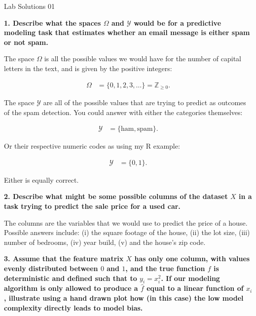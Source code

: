 \documentclass[12pt,hidelinks]{article}
\numberwithin{equation}{section}
\begin{document}
{\LARGE Lab Solutions 01}

\vspace*{12pt}

\textbf{1. Describe what the spaces $\Omega$ and $\mathcal{Y}$ would be for a
predictive modeling task that estimates whether an email message is either
spam or not spam.}

\vspace*{12pt}

The space $\Omega$ is all the possible values we would have for the number
of capital letters in the text, and is given by the positive integers:

\begin{align*}
\Omega &= \{ 0, 1, 2, 3, \ldots \} = \mathbb{Z}_{\geq 0}.
\end{align*}

The space $\mathcal{Y}$ are all of the possible values that are trying to
predict as outcomes of the spam detection. You could answer with either the
categories themselves:

\begin{align*}
\mathcal{Y} &= \{ \text{ham}, \text{spam} \}.
\end{align*}

Or their respective numeric codes as using my R example:


\begin{align*}
\mathcal{Y} &= \{ 0, 1 \}.
\end{align*}

Either is equally correct.

\vspace*{12pt}

\textbf{2. Describe what might be some possible columns of the dataset $X$ in
a task trying to predict the sale price for a used car.}

\vspace*{12pt}

The columns are the variables that we would use to predict the price of a
house. Possible answers include: (i) the square footage of the house, (ii)
the lot size, (iii) number of bedrooms, (iv) year build, (v) and the house's
zip code.

\vspace*{12pt}

\textbf{3. Assume that the feature matrix $X$ has only one column, with values
evenly distributed between $0$ and $1$, and the true function $f$ is
deterministic and defined such that to $y_i = x_i^2$. If our modeling
algorithm is only allowed to produce a $\widehat{f}$ equal to a linear
function of $x_i$, illustrate using a hand drawn plot how (in this case) the
low model complexity directly leads to model bias.}
\end{document}
